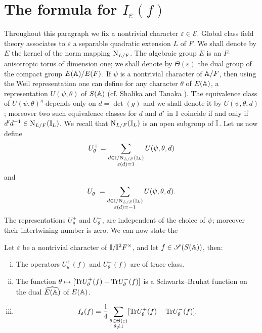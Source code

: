 \section{The formula for $I_\varepsilon(f)$}
\label{sec:formulaI}

Throughout this paragraph we fix a nontrivial character $\varepsilon \in \mathscr{E}$.
Global class field theory associates to $\varepsilon$ a separable quadratic extension $L$ of $F$.
We shall denote by $E$ the kernel of the norm mapping $\mathrm{N}_{L/F}$.
The algebraic group $E$ is an $F$-anisotropic torus of dimension one; we shall denote by $\Theta(\varepsilon)$ the dual group of the compact group $E(\mathbb{A}) / E(F)$.
If $\psi$ is a nontrivial character of $\mathbb{A}/F$, then using the Weil representation one can define for any character $\theta$ of $E(\mathbb{A})$, a representation $U(\psi, \theta)$ of $S(\mathbb{A})$ (cf. Shalika and Tanaka \cite{shalika1969explicit}).
The equivalence class of $U(\psi, \theta)^{g}$ depends only on $d = \det(g)$ and we shall denote it by $U(\psi, \theta, d)$; moreover two such equivalence classes for $d$ and $d'$ in $\mathbb{I}$ coincide if and only if $d'd^{-1} \in \mathrm{N}_{L/F}(\mathbb{I}_L)$.
We recall that $\mathrm{N}_{L/F}(\mathbb{I}_L)$ is an open subgroup of $\mathbb{I}$.
Let us now define
\[
U^+_\theta = \sum_{\substack{d \in \mathbb{I} / \mathrm{N}_{L/F}(\mathbb{I}_L) \\ \varepsilon(d) = 1}} U(\psi, \theta, d)
\]
and
\[
U^-_\theta = \sum_{\substack{d \in \mathbb{I} / \mathrm{N}_{L/F}(\mathbb{I}_L) \\ \varepsilon(d) = -1}} U(\psi, \theta, d).
\]
The representations $U^+_\theta$ and $U^-_\theta$, are independent of the choice of $\psi$; moreover their intertwining number is zero. We can now state the

\begin{theorem}
Let $\varepsilon$ be a nontrivial character of $\mathbb{I} / \mathbb{I}^2 F^\times$, and let $f \in \mathscr{S}(S(\mathbb{A}))$, then:
\begin{enumerate}[(i)]
    \item The operators $U^+_\theta(f)$ and $U^-_\theta(f)$ are of trace class.
    \item The function $\theta \mapsto [\mathrm{Tr} U^+_\theta(f) - \mathrm{Tr} U^-_\theta(f)]$ is a Schwartz--Bruhat function on the dual $\widehat{E(\mathbb{A})}$ of $E(\mathbb{A})$.
    \item $$I_\varepsilon(f) = \frac{1}{4} \sum_{\substack{\theta \in \Theta(\varepsilon) \\ \theta \ne 1}} [\mathrm{Tr} U^+_\theta(f) - \mathrm{Tr} U^-_\theta(f)].$$
\end{enumerate}
\end{theorem}


